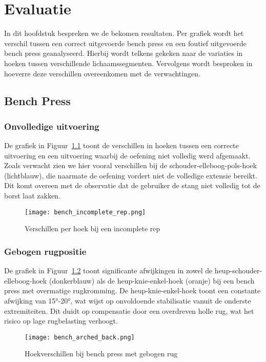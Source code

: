 \chapter{Evaluatie}
\label{ch:evaluatie}
In dit hoofdstuk bespreken we de bekomen resultaten. 
Per grafiek wordt het verschil tussen een correct uitgevoerde bench press en een foutief uitgevoerde bench press geanalyseerd. 
Hierbij wordt telkens gekeken naar de variaties in hoeken tussen verschillende lichaamssegmenten. 
Vervolgens wordt besproken in hoeverre deze verschillen overeenkomen met de verwachtingen.

\section{Bench Press}
\subsection{Onvolledige uitvoering}

De grafiek in Figuur~\ref{fig:incomplete_rep} toont de verschillen in hoeken tussen een correcte uitvoering en een uitvoering waarbij de oefening niet volledig werd afgemaakt. 
Zoals verwacht zien we hier vooral verschillen bij de schouder-elleboog-pols-hoek (lichtblauw), die naarmate de oefening vordert niet de volledige extensie bereikt. 
Dit komt overeen met de observatie dat de gebruiker de stang niet volledig tot de borst laat zakken.

\begin{figure}[H]
    \centering
    \texttt{[image: bench\_incomplete\_rep.png]}
    \caption{Verschillen per hoek bij een incomplete rep}
    \label{fig:incomplete_rep}
\end{figure}

\subsection{Gebogen rugpositie}

De grafiek in Figuur~\ref{fig:arched_back} toont significante afwijkingen in zowel de heup-schouder-elleboog-hoek (donkerblauw) als de heup-knie-enkel-hoek (oranje) bij een bench press met overmatige rugkromming. 
De heup-knie-enkel-hoek toont een constante afwijking van 15°-20°, wat wijst op onvoldoende stabilisatie vanuit de onderste extremiteiten. 
Dit duidt op compensatie door een overdreven holle rug, wat het risico op lage rugbelasting verhoogt.

\begin{figure}[H]
\centering
\texttt{[image: bench\_arched\_back.png]}
\caption{Hoekverschillen bij bench press met gebogen rug}
\label{fig:arched_back}
\end{figure}

